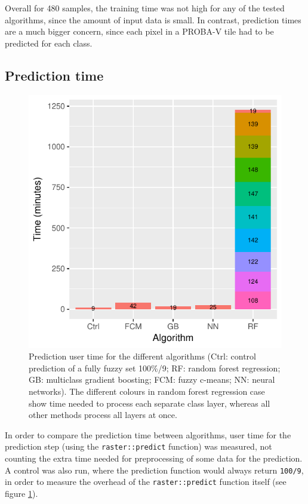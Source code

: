 \documentclass[a4paper,10pt]{book}
\begin{document}
Overall for 480 samples, the training time was not high for any of the tested algorithms, since the amount of input data is small. In contrast, prediction times are a much bigger concern, since each pixel in a PROBA-V tile had to be predicted for each class.

\subsection{Prediction time}

\begin{figure}
  \centering
  \includegraphics[width=\textwidth]{../plot/timing}
  \caption{Prediction user time for the different algorithms (Ctrl: control prediction of a fully fuzzy set 100\%/9; RF: random forest regression; GB: multiclass gradient boosting; FCM: fuzzy c-means; NN: neural networks). The different colours in random forest regression case show time needed to process each separate class layer, whereas all other methods process all layers at once.}
  \label{fig-timing}
\end{figure}

In order to compare the prediction time between algorithms, user time for the prediction step (using the \texttt{raster::predict} function) was measured, not counting the extra time needed for preprocessing of some data for the prediction. A control was also run, where the prediction function would always return \texttt{100/9}, in order to measure the overhead of the \texttt{raster::predict} function itself (see figure \ref{fig-timing}).
\end{document}
